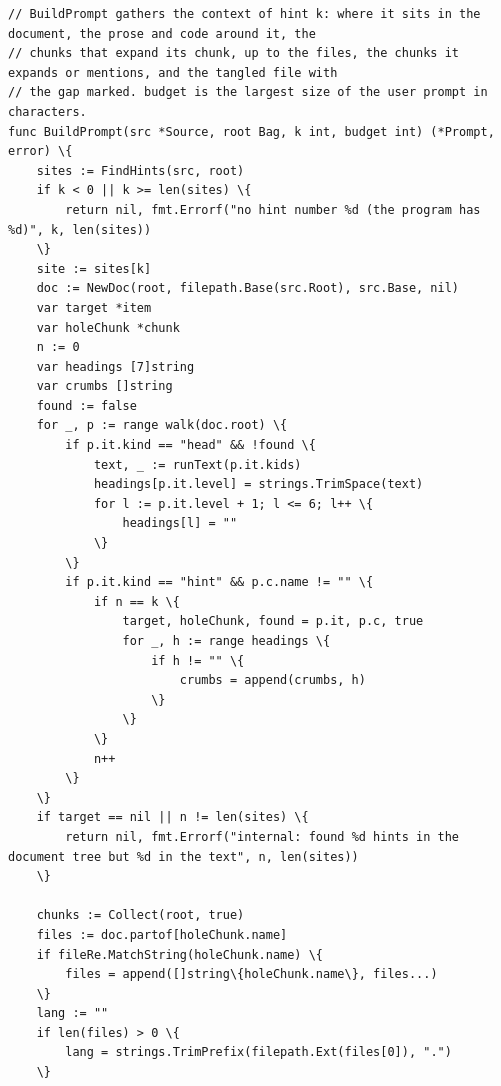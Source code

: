 \documentclass[10pt,a4paper]{article}
\newcounter{chunk}
\begin{document}
\begin{Verbatim}
// BuildPrompt gathers the context of hint k: where it sits in the document, the prose and code around it, the
// chunks that expand its chunk, up to the files, the chunks it expands or mentions, and the tangled file with
// the gap marked. budget is the largest size of the user prompt in characters.
func BuildPrompt(src *Source, root Bag, k int, budget int) (*Prompt, error) \{
	sites := FindHints(src, root)
	if k < 0 || k >= len(sites) \{
		return nil, fmt.Errorf("no hint number %d (the program has %d)", k, len(sites))
	\}
	site := sites[k]
	doc := NewDoc(root, filepath.Base(src.Root), src.Base, nil)
	var target *item
	var holeChunk *chunk
	n := 0
	var headings [7]string
	var crumbs []string
	found := false
	for _, p := range walk(doc.root) \{
		if p.it.kind == "head" && !found \{
			text, _ := runText(p.it.kids)
			headings[p.it.level] = strings.TrimSpace(text)
			for l := p.it.level + 1; l <= 6; l++ \{
				headings[l] = ""
			\}
		\}
		if p.it.kind == "hint" && p.c.name != "" \{
			if n == k \{
				target, holeChunk, found = p.it, p.c, true
				for _, h := range headings \{
					if h != "" \{
						crumbs = append(crumbs, h)
					\}
				\}
			\}
			n++
		\}
	\}
	if target == nil || n != len(sites) \{
		return nil, fmt.Errorf("internal: found %d hints in the document tree but %d in the text", n, len(sites))
	\}

	chunks := Collect(root, true)
	files := doc.partof[holeChunk.name]
	if fileRe.MatchString(holeChunk.name) \{
		files = append([]string\{holeChunk.name\}, files...)
	\}
	lang := ""
	if len(files) > 0 \{
		lang = strings.TrimPrefix(filepath.Ext(files[0]), ".")
	\}


\end{Verbatim}
\end{document}
